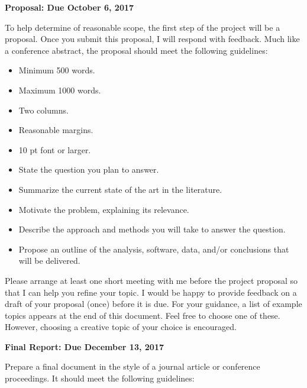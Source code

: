 \documentclass[12pts, answers]{exam}
\begin{document}
\begin{questions}
\addpoints

\question[10] \textbf{Proposal: Due October 6, 2017}

To help determine of reasonable scope, the first step of the project will be a
proposal. Once you submit this proposal, I will respond with feedback. Much
like a conference abstract, the proposal should meet the following guidelines:

\begin{itemize}
\item Minimum 500 words.
\item Maximum 1000 words.
\item Two columns.
\item Reasonable margins.
\item 10 pt font or larger.
\item State the question you plan to answer.
\item Summarize the current state of the art in the literature.
\item Motivate the problem, explaining its relevance.
\item Describe the approach and methods you will take to answer the question.
\item Propose an outline of the analysis, software, data, and/or conclusions that will be delivered.
\end{itemize}

Please arrange at least one short meeting with me before the project proposal 
so that I can help you refine your topic. I would be happy to provide feedback 
on a draft of your proposal (once) before it is due. For your guidance, a list 
of example topics appears at the end of this document. Feel free to choose one 
of these.  However, choosing a creative topic of your choice is 
encouraged.


\question[90] \textbf{Final Report: Due December 13, 2017}

Prepare a final document in the style of a journal article or conference 
proceedings. It should meet the following guidelines:


\end{questions}
\end{document}
